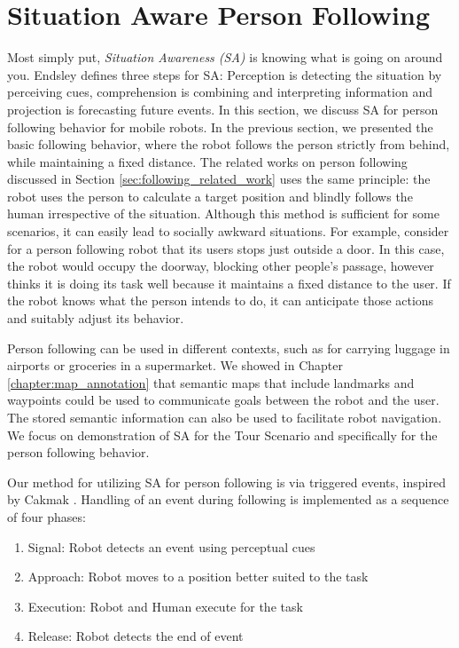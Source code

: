 \chapter{Situation Aware Person Following}
\label{sec:following_situation_aware}

Most simply put, \textit{Situation Awareness (SA)} is knowing what is going on around you. Endsley \cite{endsley2000situation} defines three steps for SA: Perception is detecting the situation by perceiving cues, comprehension is combining and interpreting information and projection is forecasting future events. In this section, we discuss SA for person following behavior for mobile robots. In the previous section, we presented the basic following behavior, where the robot follows the person strictly from behind, while maintaining a fixed distance. The related works on person following discussed in Section \ref{sec:following_related_work} uses the same principle: the robot uses the person to calculate a target position and blindly follows the human irrespective of the situation. Although this method is sufficient for some scenarios, it can easily lead to socially awkward situations. For example, consider for a person following robot that its users stops just outside a door. In this case, the robot would occupy the doorway, blocking other people's passage, however thinks it is doing its task well because it maintains a fixed distance to the user. If the robot knows what the person intends to do, it can anticipate those actions and suitably adjust its behavior.

Person following can be used in different contexts, such as for carrying luggage in airports or groceries in a supermarket. We showed in Chapter \ref{chapter:map_annotation} that semantic maps that include landmarks and waypoints could be used to communicate goals between the robot and the user.  The stored semantic information can also be used to facilitate robot navigation. We focus on demonstration of SA for the Tour Scenario and specifically for the person following behavior.

Our method for utilizing SA for person following is via triggered events, inspired by Cakmak \cite{cakmak2011using}. Handling of an event during following is implemented as a sequence of four phases:

\begin{enumerate}
\item Signal: Robot detects an event using perceptual cues
\item Approach: Robot moves to a position better suited to the task
\item Execution: Robot and Human execute for the task
\item Release: Robot detects the end of event
\end{enumerate}

